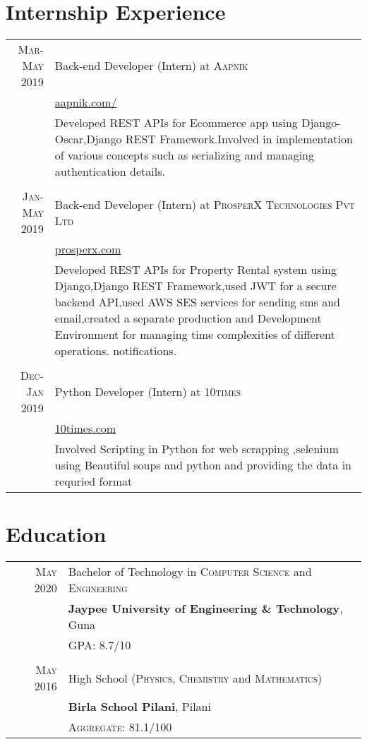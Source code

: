\documentclass[a4paper,1pt]{article}
\begin{document}
\section{Internship Experience}
\begin{tabular}{r|p{11cm}}

 \textsc{  Mar-May 2019} & Back-end Developer (Intern) at \textsc{Aapnik}\\&\href{https://www.aapnik.com/}{aapnik.com/}\\&\footnotesize{Developed REST APIs for Ecommerce app using Django-Oscar,Django REST Framework.Involved in implementation of various concepts such as serializing and managing authentication details.
}\\\multicolumn{2}{c}{} \\

 \textsc{   Jan-May 2019} & Back-end Developer (Intern) at \textsc{ProsperX Technologies Pvt Ltd}\\&\href{https://prosperx.com/}{prosperx.com}\\&\footnotesize{Developed REST APIs for Property Rental system using Django,Django REST Framework,used JWT for a secure backend API,used AWS SES services for sending sms and email,created a separate production and Development Environment for managing time complexities of different operations. notifications.}\\\multicolumn{2}{c}{} \\
 
\textsc{Dec-Jan 2019} & Python Developer (Intern) at \textsc{10times}\\&\href{https://www.10times.com}{10times.com}\\&\footnotesize{Involved Scripting in Python for web scrapping ,selenium using Beautiful soups and python and providing the data in requried format}
\end{tabular}\bigskip\par

\section{Education}
\begin{tabular}{rl}	
 \textsc{May} 2020 & Bachelor of Technology in \textsc{Computer Science} and \textsc{Engineering}\\& \textbf{Jaypee University of Engineering \& Technology}, Guna\\&
 \normalsize \textsc{GPA}: 8.7/10\\&\\
\textsc{May} 2016& High School (\textsc{Physics}, \textsc{Chemistry} and \textsc{Mathematics})\\&
\normalsize\textbf{Birla School Pilani}, Pilani
\\&\normalsize \textsc{Aggregate}: 81.1/100\\
\end{tabular}\bigskip\par
\end{document}
